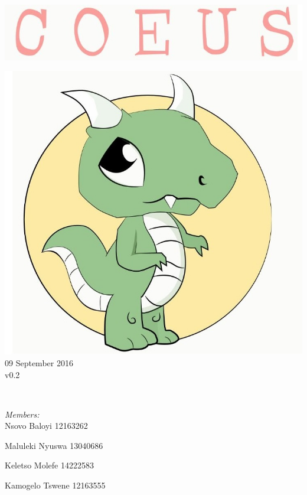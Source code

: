 \documentclass[a4paper,12pt]{article}
\begin{document}
\begin{titlepage}
	\includegraphics[width=\textwidth]{../name} \\[1cm]
	\begin{minipage}{0.4\textwidth}
	\begin{flushleft} \large
	\includegraphics[width=\textwidth]{../logo} \\[0.5cm]
	{\large 09 September 2016}\\
	{\large v0.2}
	\end{flushleft}
	\end{minipage}
	~
	\begin{minipage}{0.5\textwidth}
	\begin{flushright} \large
	\emph{Members:}\\%
	Nsovo Baloyi 12163262

	Maluleki Nyuswa 13040686
	
	Keletso Molefe 14222583
	
	Kamogelo Tswene 12163555

	\end{flushright}
	\end{minipage}\\[4cm]
\end{titlepage}
\end{document}
